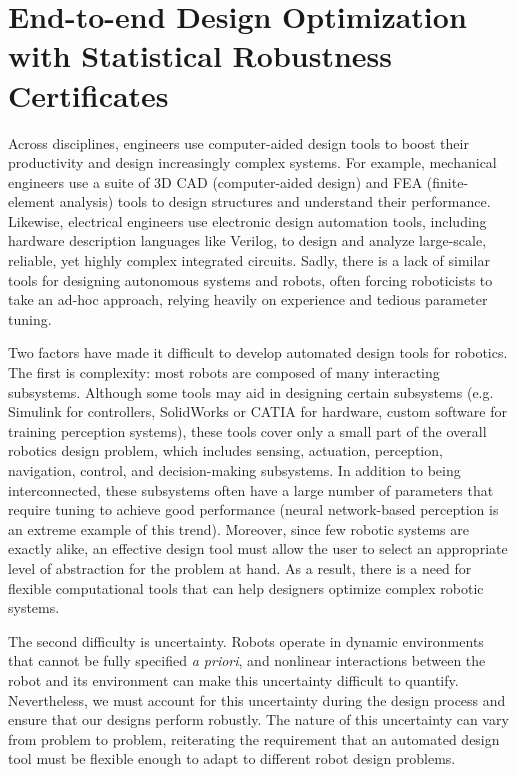 \chapter{End-to-end Design Optimization with Statistical Robustness Certificates}\label{ch:rss}

Across disciplines, engineers use computer-aided design tools to boost their productivity and design increasingly complex systems. For example, mechanical engineers use a suite of 3D CAD (computer-aided design) and FEA (finite-element analysis) tools to design structures and understand their performance. Likewise, electrical engineers use electronic design automation tools, including hardware description languages like Verilog, to design and analyze large-scale, reliable, yet highly complex integrated circuits. Sadly, there is a lack of similar tools for designing autonomous systems and robots, often forcing roboticists to take an ad-hoc approach, relying heavily on experience and tedious parameter tuning.

Two factors have made it difficult to develop automated design tools for robotics. The first is complexity: most robots are composed of many interacting subsystems. Although some tools may aid in designing certain subsystems (e.g. Simulink for controllers, SolidWorks or CATIA for hardware, custom software for training perception systems), these tools cover only a small part of the overall robotics design problem, which includes sensing, actuation, perception, navigation, control, and decision-making subsystems. In addition to being interconnected, these subsystems often have a large number of parameters that require tuning to achieve good performance (neural network-based perception is an extreme example of this trend). Moreover, since few robotic systems are exactly alike, an effective design tool must allow the user to select an appropriate level of abstraction for the problem at hand. As a result, there is a need for flexible computational tools that can help designers optimize complex robotic systems.

The second difficulty is uncertainty. Robots operate in dynamic environments that cannot be fully specified \textit{a priori}, and nonlinear interactions between the robot and its environment can make this uncertainty difficult to quantify. Nevertheless, we must account for this uncertainty during the design process and ensure that our designs perform robustly. The nature of this uncertainty can vary from problem to problem, reiterating the requirement that an automated design tool must be flexible enough to adapt to different robot design problems.

